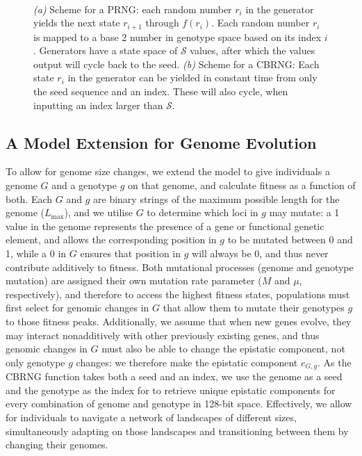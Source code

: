 \documentclass[paper=a4, fontsize=11pt,twoside]{scrartcl}       %
\begin{document}
\begin{figure}[h!]
	\centering
	\\
	\label{rngs}
	\caption{\textit{(a)} Scheme for a PRNG: each random number $r_i$ in the generator yields the next state $r_{i+1}$ through $f(r_i)$. Each random number $r_i$ is mapped to a base 2 number in genotype space based on its index $i$. Generators have a state space of $\mathcal{S}$ values, after which the values output will cycle back to the seed. \textit{(b)} Scheme for a CBRNG: Each state $r_i$ in the generator can be yielded in constant time from only the seed sequence and an index. These will also cycle, when inputting an index larger than $\mathcal{S}$.}
\end{figure}

\subsection*{A Model Extension for Genome Evolution}

To allow for genome size changes, we extend the model to give individuals a genome $G$ and a genotype $g$ on that genome, and calculate fitness as a function of both. Each $G$ and $g$ are binary strings of the maximum possible length for the genome ($L_{\text{max}}$), and we utilise $G$ to determine which loci in $g$ may mutate: a 1 value in the genome represents the presence of a gene or functional genetic element, and allows the corresponding position in $g$ to be mutated between 0 and 1, while a 0 in $G$ ensures that position in $g$ will always be 0, and thus never contribute additively to fitness. Both mutational processes (genome and genotype mutation) are assigned their own mutation rate parameter ($M$ and $\mu$, respectively), and therefore to access the highest fitness states, populations must first select for genomic changes in $G$ that allow them to mutate their genotypes $g$ to those fitness peaks. Additionally, we assume that when new genes evolve, they may interact nonadditively with other previously existing genes, and thus genomic changes in $G$ must also be able to change the epistatic component, not only genotype $g$ changes: we therefore make the epistatic component $e_{G,g}$. As the CBRNG function takes both a seed and an index, we use the genome as a seed and the genotype as the index for to retrieve unique epistatic components for every combination of genome and genotype in 128-bit space. Effectively, we allow for individuals to navigate a network of landscapes of different sizes, simultaneously adapting on those landscapes and transitioning between them by changing their genomes.
\end{document}
